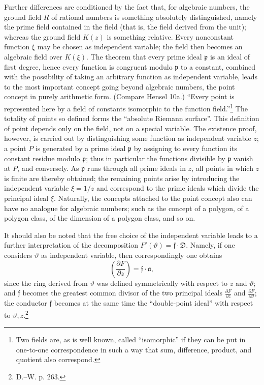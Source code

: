 \documentclass[11pt]{article}
\providecommand{\p}{\partial}
\providecommand{\frp}{\mathfrak p}
\providecommand{\fra}{\mathfrak a}
\providecommand{\frf}{\mathfrak f}
\providecommand{\frD}{\mathfrak D}
\providecommand{\p}{\partial}
\begin{document}
Further differences are conditioned by the fact that, for algebraic numbers, the ground field \(R\) of rational numbers is something absolutely distinguished, namely the prime field contained in the field (that is, the field derived from the unit); whereas the ground field \(K(z)\) is something relative. Every nonconstant function \(\xi\) may be chosen as independent variable; the field then becomes an algebraic field over \(K(\xi)\). The theorem that every prime ideal \(\frp\) is an ideal of first degree, hence every function is congruent modulo \(\frp\) to a constant, combined with the possibility of taking an arbitrary function as independent variable, leads to the most important concept going beyond algebraic numbers, the point concept in purely arithmetic form. (Compare Hensel 10a.) ``Every point is represented here by a field of constants isomorphic to the function field.''\footnote{Two fields are, as is well known, called ``isomorphic'' if they can be put in one-to-one correspondence in such a way that sum, difference, product, and quotient also correspond.} The totality of points so defined forms the ``absolute Riemann surface''. This definition of point depends only on the field, not on a special variable. The existence proof, however, is carried out by distinguishing some function as independent variable \(z\); a point \(P\) is generated by a prime ideal \(\frp\) by assigning to every function its constant residue modulo \(\frp\); thus in particular the functions divisible by \(\frp\) vanish at \(P\), and conversely. As \(\frp\) runs through all prime ideals in \(z\), all points in which \(z\) is finite are thereby obtained; the remaining points arise by introducing the independent variable \(\xi=1/z\) and correspond to the prime ideals which divide the principal ideal \(\xi\). Naturally, the concepts attached to the point concept also can have no analogue for algebraic numbers; such as the concept of a polygon, of a polygon class, of the dimension of a polygon class, and so on.


It should also be noted that the free choice of the independent variable leads to a further interpretation of the decomposition \(F'(\vartheta)=\frf\cdot\frD\). Namely, if one considers \(\vartheta\) as independent variable, then correspondingly one obtains
\[
\left(\frac{\p F}{\p z}\right)=\frf\cdot\fra,
\]
since the ring derived from \(\vartheta\) was defined symmetrically with respect to \(z\) and \(\vartheta\); and \(\frf\) becomes the greatest common divisor of the two principal ideals \(\frac{\p F}{\p z}\) and \(\frac{\p F}{\p\vartheta}\); the conductor \(\frf\) becomes at the same time the ``double-point ideal'' with respect to \(\vartheta,z\).\footnote{D.--W. p. 263.}
\end{document}
